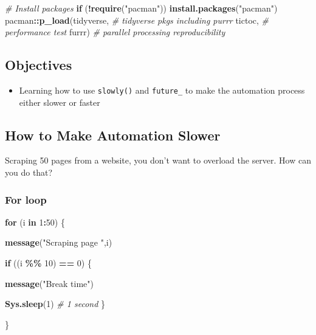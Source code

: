 \documentclass[
]{book}
\newenvironment{Shaded}{\begin{snugshade}}{\end{snugshade}}
\newcommand{\CommentTok}[1]{\textcolor[rgb]{0.56,0.35,0.01}{\textit{#1}}}
\newcommand{\ControlFlowTok}[1]{\textcolor[rgb]{0.13,0.29,0.53}{\textbf{#1}}}
\newcommand{\DecValTok}[1]{\textcolor[rgb]{0.00,0.00,0.81}{#1}}
\newcommand{\FunctionTok}[1]{\textcolor[rgb]{0.13,0.29,0.53}{\textbf{#1}}}
\newcommand{\NormalTok}[1]{#1}
\newcommand{\SpecialCharTok}[1]{\textcolor[rgb]{0.81,0.36,0.00}{\textbf{#1}}}
\newcommand{\StringTok}[1]{\textcolor[rgb]{0.31,0.60,0.02}{#1}}
\providecommand{\tightlist}{%
  \setlength{\itemsep}{0pt}\setlength{\parskip}{0pt}}
\begin{document}
\begin{Shaded}
\begin{Highlighting}[]
\CommentTok{\# Install packages }
\ControlFlowTok{if}\NormalTok{ (}\SpecialCharTok{!}\FunctionTok{require}\NormalTok{(}\StringTok{"pacman"}\NormalTok{)) }\FunctionTok{install.packages}\NormalTok{(}\StringTok{"pacman"}\NormalTok{)}
\NormalTok{pacman}\SpecialCharTok{::}\FunctionTok{p\_load}\NormalTok{(tidyverse, }\CommentTok{\# tidyverse pkgs including purrr}
\NormalTok{               tictoc, }\CommentTok{\# performance test }
\NormalTok{               furrr) }\CommentTok{\# parallel processing  reproducibility }
\end{Highlighting}
\end{Shaded}

\subsection{Objectives}\label{objectives-3}

\begin{itemize}
\tightlist
\item
  Learning how to use \texttt{slowly()} and \texttt{future\_} to make the automation process either slower or faster
\end{itemize}

\subsection{How to Make Automation Slower}\label{how-to-make-automation-slower}

Scraping 50 pages from a website, you don't want to overload the server. How can you do that?

\subsubsection{For loop}\label{for-loop-2}

\begin{Shaded}
\begin{Highlighting}[]
\ControlFlowTok{for}\NormalTok{ (i }\ControlFlowTok{in} \DecValTok{1}\SpecialCharTok{:}\DecValTok{50}\NormalTok{) \{}
  
  \FunctionTok{message}\NormalTok{(}\StringTok{"Scraping page "}\NormalTok{,i)}
  
  \ControlFlowTok{if}\NormalTok{ ((i }\SpecialCharTok{\%\%} \DecValTok{10}\NormalTok{) }\SpecialCharTok{==} \DecValTok{0}\NormalTok{) \{}
    
    \FunctionTok{message}\NormalTok{(}\StringTok{"Break time"}\NormalTok{)}
    
    \FunctionTok{Sys.sleep}\NormalTok{(}\DecValTok{1}\NormalTok{) }\CommentTok{\# 1 second }
\NormalTok{  \}}
  
\NormalTok{\}}
\end{Highlighting}
\end{Shaded}
\end{document}
